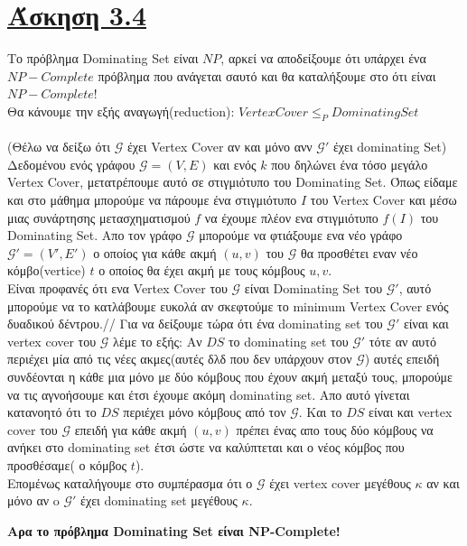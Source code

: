 \documentclass[12pt]{article}
\begin{document}
\section{\underline{Άσκηση 3.4}}
Το πρόβλημα Dominating Set είναι $NP$, αρκεί να αποδείξουμε ότι υπάρχει ένα $NP-Complete$ πρόβλημα που ανάγεται σαυτό και θα καταλήξουμε στο ότι είναι $NP-Complete$!\\
Θα κάνουμε την εξής αναγωγή(reduction): $Vertex Cover\le_P Dominating Set$\\\\
(Θέλω να δείξω ότι $\mathcal{G}$ έχει Vertex Cover αν και μόνο ανν $\mathcal{G'}$ έχει dominating Set)\\
Δεδομένου ενός γράφου $\mathcal{G} = (V,E)$ και ενός $k$ που δηλώνει ένα τόσο μεγάλο Vertex Cover, μετατρέπουμε αυτό σε στιγμιότυπο του Dominating Set. Όπως είδαμε και στο μάθημα μπορούμε να πάρουμε  ένα στιγμιότυπο $I$ του Vertex Cover  και μέσω μιας συνάρτησης μετασχηματισμού $f$ να έχουμε πλέον ενα στιγμιότυπο $f(I)$ του Dominating Set. Aπο τον γράφο $\mathcal{G}$ μπορούμε να φτιάξουμε ενα νέο γράφο  $\mathcal{G'} = (V',E')$ ο οποίος για κάθε ακμή $(u,v)$ του  $\mathcal{G}$ θα προσθέτει εναν νέο κόμβο(vertice) $t$ ο οποίος θα έχει ακμή με τους κόμβους $u, v$. \\

  Είναι προφανές ότι ενα Vertex Cover του $\mathcal{G}$ είναι Dominating Set του $\mathcal{G'}$, αυτό μπορούμε να το κατλάβουμε ευκολά αν σκεφτούμε το minimum Vertex Cover ενός δυαδικού δέντρου.//
  Για να δείξουμε τώρα ότι ένα dominating set του $\mathcal{G'}$ είναι και vertex cover του $\mathcal{G}$ λέμε το εξής: Αν $DS$ το dominating set του $\mathcal{G'}$ τότε αν αυτό περιέχει μία από τις νέες ακμες(αυτές δλδ που δεν υπάρχουν στον $\mathcal{G}$) αυτές επειδή συνδέονται η κάθε μια μόνο με δύο κόμβους που έχουν ακμή μεταξύ τους, μπορούμε να τις αγνοήσουμε και έτσι έχουμε ακόμη  dominating set. Απο αυτό γίνεται κατανοητό ότι το $DS$ περιέχει μόνο κόμβους από τον $\mathcal{G}$. Και το $DS$ είναι και vertex cover του $\mathcal{G}$ επειδή για κάθε ακμή $(u,v)$  πρέπει ένας απο τους δύο κόμβους να ανήκει στο dominating set έτσι ώστε να καλύπτεται και ο νέος κόμβος που προσθέσαμε( ο κόμβος $t$).\\
  Επομένως καταλήγουμε στο συμπέρασμα ότι ο $\mathcal{G}$ έχει vertex cover μεγέθους $κ$ αν και μόνο αν o $\mathcal{G'}$ έχει dominating set μεγέθους $κ$.
  
  \textbf{Αρα το πρόβλημα Dominating Set είναι NP-Complete!}
  
\end{document}
